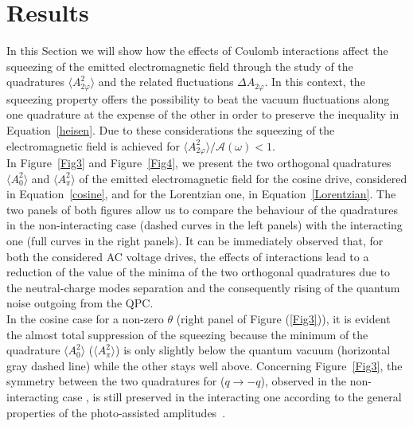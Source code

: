 \documentclass[12pt]{iopart}
\begin{document}
\section{Results}\label{results}
In this Section we will show how the effects of Coulomb interactions affect the squeezing of the emitted electromagnetic field through the study of the quadratures $\langle A^2_{2\varphi}\rangle$ and the related fluctuations $\Delta A_{2\varphi}$. In this context, the squeezing property offers the possibility to beat the vacuum fluctuations along one quadrature at the expense of the other in order to preserve the inequality in Equation~\eqref{heisen}. Due to these considerations the squeezing of the electromagnetic field is achieved for $\langle A^2_{2\varphi}\rangle/\mathcal{A}(\omega)<1$.\\
In Figure~\ref{Fig3} and Figure~\ref{Fig4}, we present the two orthogonal quadratures $\langle A^2_{0}\rangle$ and $\langle A^2_{\pi}\rangle$ of the emitted electromagnetic field for the cosine drive, considered in Equation~\eqref{cosine}, and for the Lorentzian one, in Equation~\eqref{Lorentzian}. The two panels of both figures allow us to compare the behaviour of the quadratures in the non-interacting case (dashed curves in the left panels) with the interacting one (full curves in the right panels). It can be immediately observed that, for both the considered AC voltage drives, the effects of interactions lead to a reduction of the value of the minima of the two orthogonal quadratures due to the neutral-charge modes separation and the consequently rising of the quantum noise outgoing from the QPC.\\
In the cosine case for a non-zero $\theta$ (right panel of Figure (\ref{Fig3})), it is evident the almost total suppression of the squeezing because the minimum of the quadrature $\langle {A}^2_0\rangle$ ($\langle A_\pi^2\rangle$) is only slightly below the quantum vacuum (horizontal gray dashed line) while the other stays well above. Concerning Figure~\ref{Fig3}, the symmetry between the two quadratures for ($q\rightarrow -q$), observed in the non-interacting case \cite{Ferraro18}, is still preserved in the interacting one according to the general properties of the photo-assisted amplitudes~\cite{Dubois13, Ronetti19b}.\\
\end{document}
